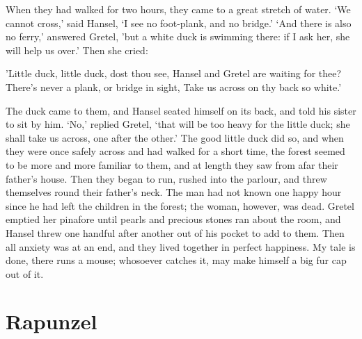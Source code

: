 \documentclass[oneside,11pt]{memoir} %
\begin{document}
When they had walked for two hours, they came to a great stretch of water. `We cannot cross,' said Hansel, `I see no foot-plank, and no bridge.' `And there is also no ferry,' answered Gretel, 'but a white
duck is swimming there: if I ask her, she will help us over.' Then she cried:

'Little duck, little duck, dost thou see,
Hansel and Gretel are waiting for thee?
There's never a plank, or bridge in sight,
Take us across on thy back so white.'

The duck came to them, and Hansel seated himself on its back, and told his sister to sit by him. `No,' replied Gretel, `that will be too heavy for the little duck; she shall take us across, one after the other.' The good little duck did so, and when they were once safely across and had walked for a short time, the forest seemed to be more and more familiar to them, and at length they saw from afar their father's house. Then they began to run, rushed into the parlour, and threw themselves round their father's neck. The man had not known one happy hour since he had left the children in the forest; the woman, however, was dead. Gretel emptied her pinafore until pearls and precious stones ran about the room, and Hansel threw one handful after another out of his pocket to add to them. Then all anxiety was at an end, and they lived together in perfect happiness. My tale is done, there runs a mouse; whosoever catches it, may make himself a big fur cap out of it.


\chapter{Rapunzel}
\end{document}
